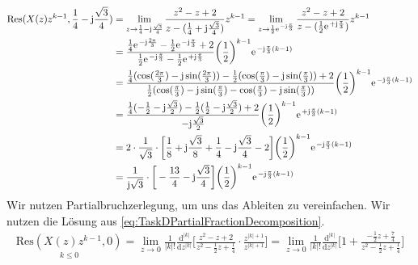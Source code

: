 \documentclass[11pt,a4paper,DIV=12]{scrartcl}
\begin{document}
\begin{align}
	\mathrm{Res}(X(z)z^{k-1},\frac{1}{4}-\im\frac{\sqrt{3}}{4})&=\lim\limits_{z\rightarrow\frac{1}{4}-\im\frac{\sqrt{3}}{4}}\frac{z^2-z+2}{z-(\frac{1}{4}+\im\frac{\sqrt{3}}{4})}z^{k-1}=\lim\limits_{z\rightarrow\frac{1}{2}\e^{-\im\frac{\pi}{3}}}\frac{z^2-z+2}{z-(\frac{1}{2}\e^{+\im\frac{\pi}{3}})}z^{k-1}\nonumber\\
	&=\frac{\frac{1}{4}\e^{-\im\frac{2\pi}{3}}-\frac{1}{2}\e^{-\im\frac{\pi}{3}}+2}{\frac{1}{2}\e^{-\im\frac{\pi}{3}}-\frac{1}{2}\e^{+\im\frac{\pi}{3}}}\bigg(\frac{1}{2}\bigg )^{k-1}\e^{-\im\frac{\pi}{3}(k-1)}\nonumber\\
	&=\frac{\frac{1}{4}(\cos(\frac{2\pi}{3})-\im\sin(\frac{2\pi}{3}))-\frac{1}{2}(\cos(\frac{\pi}{3})-\im\sin(\frac{\pi}{3}))+2}{\frac{1}{2}(\cos(\frac{\pi}{3})-\im\sin(\frac{\pi}{3})-\cos(\frac{\pi}{3})-\im\sin(\frac{\pi}{3}))}\bigg(\frac{1}{2}\bigg )^{k-1}\e^{-\im\frac{\pi}{3}(k-1)}\nonumber\\
	&=\frac{\frac{1}{4}(-\frac{1}{2}-\im\frac{\sqrt{3}}{2})-\frac{1}{2}(\frac{1}{2}-\im\frac{\sqrt{3}}{2})+2}{-\im\frac{\sqrt{3}}{2}}\bigg(\frac{1}{2}\bigg )^{k-1}\e^{+\im\frac{\pi}{3}(k-1)}\nonumber\\
	&=2\cdot\frac{1}{\sqrt{3}}\cdot\bigg [\frac{1}{8}+\im\frac{\sqrt{3}}{8}+\frac{1}{4}-\im\frac{\sqrt{3}}{4}-2\bigg]\bigg(\frac{1}{2}\bigg )^{k-1}\e^{-\im\frac{\pi}{3}(k-1)}\nonumber\\
	&=\frac{1}{\im\sqrt{3}}\cdot\bigg [-\frac{13}{4}-\im\frac{\sqrt{3}}{4}\bigg]\bigg(\frac{1}{2}\bigg)^{k-1}\e^{-\im\frac{\pi}{3}(k-1)}
\end{align}
Wir nutzen Partialbruchzerlegung, um uns das Ableiten zu vereinfachen. Wir nutzen die Lösung aus \eqref{eq:TaskDPartialFractionDecomposition}.
\begin{align}
	\underset{k\leq0}{\mathrm{Res}(X(z)z^{k-1},0)}=\lim\limits_{z\rightarrow0}\frac{1}{|k|!}\frac{\mathrm{d}^{|k|}}{\mathrm{d}z^{|k|}} \Bigg [ \frac{z^2-z+2}{z^2-\frac{1}{2}z+\frac{1}{4}}\cdot\frac{z^{|k|+1}}{z^{|k|+1}}\Bigg ]=\lim\limits_{z\rightarrow0}\frac{1}{|k|!}\frac{\mathrm{d}^{|k|}}{\mathrm{d}z^{|k|}}\Bigg [1+\frac{-\frac{1}{2}z+\frac{7}{4}}{z^2-\frac{1}{2}z+\frac{1}{4}} \Bigg]\nonumber\\
\end{align}
\end{document}
